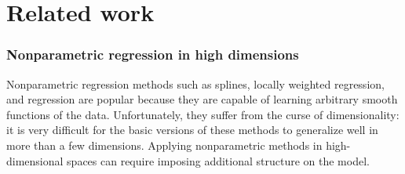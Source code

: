 







\section{Related work}
\label{sec:related-work}

\def\rwsheader{\subsubsection}


\rwsheader{Nonparametric regression in high dimensions}
Nonparametric regression methods such as splines, locally weighted regression, and \gp{} regression are popular because they are capable of learning arbitrary smooth functions of the data.
Unfortunately, they suffer from the curse of dimensionality: it is very difficult for the basic versions of these methods to generalize well in more than a few dimensions.
Applying nonparametric methods in high-dimensional spaces can require imposing additional structure on the model.

